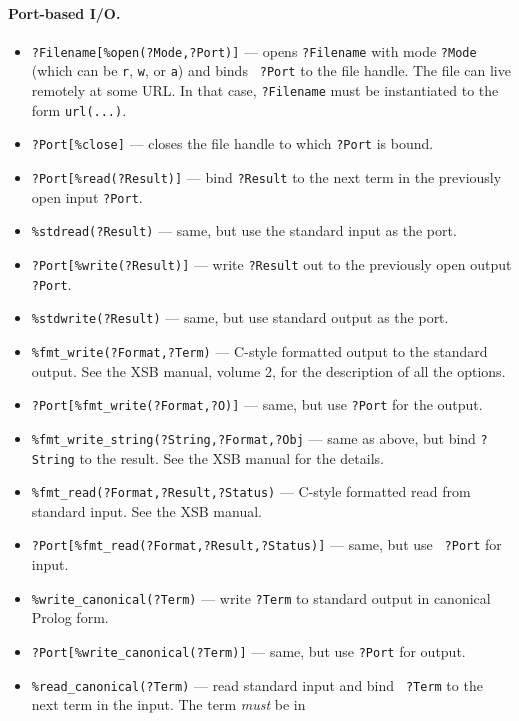 \documentclass[11pt]{article}
\begin{document}
\paragraph{Port-based I/O.}
\begin{itemize}
\item  {\tt ?Filename[\%open(?Mode,?Port)]} --- opens {\tt ?Filename} with mode
  {\tt ?Mode} (which can be {\tt r}, {\tt w}, or {\tt a}) and binds {\tt
  ?Port} to the file handle.
  The file can live remotely at some URL. In that case, {\tt ?Filename}
  must be instantiated to the form {\tt url(...)}.  
\item {\tt ?Port[\%close]} --- closes the file handle to which {\tt ?Port} is
  bound.
\item {\tt ?Port[\%read(?Result)]} --- bind {\tt ?Result} to the next term
  in the previously open input {\tt ?Port}.
\item {\tt \verb|%|stdread(?Result)} --- same, but use the standard input as the port.
\item {\tt ?Port[\%write(?Result)]} --- write {\tt ?Result} out to the
  previously open output {\tt ?Port}.
\item {\tt \verb|%|stdwrite(?Result)} --- same, but use standard output as the port.
\item {\tt \verb|%|fmt\_write(?Format,?Term)} --- C-style formatted output to the
  standard output. See the XSB manual, volume 2, for the description of all
  the options.
\item {\tt ?Port[\%fmt\_write(?Format,?O)]} --- same, but use {\tt ?Port} for the
  output. 
\item {\tt \verb|%|fmt\_write\_string(?String,?Format,?Obj} --- same as above, but bind
  {\tt ?String} to the result. See the XSB manual for the details.
\item {\tt \verb|%|fmt\_read(?Format,?Result,?Status)} --- C-style formatted read from
  standard input. See the XSB manual.
\item {\tt ?Port[\%fmt\_read(?Format,?Result,?Status)]}  ---  same, but use {\tt
    ?Port} for input.
\item {\tt \verb|%|write\_canonical(?Term)} --- write {\tt ?Term} to standard output
  in canonical Prolog form.
\item {\tt ?Port[\%write\_canonical(?Term)]} --- same, but use {\tt ?Port} for
  output.
\item {\tt \verb|%|read\_canonical(?Term)} --- read standard input and bind {\tt
    ?Term} to the next term in the input. The term \emph{must} be in

\end{itemize}
\end{document}
